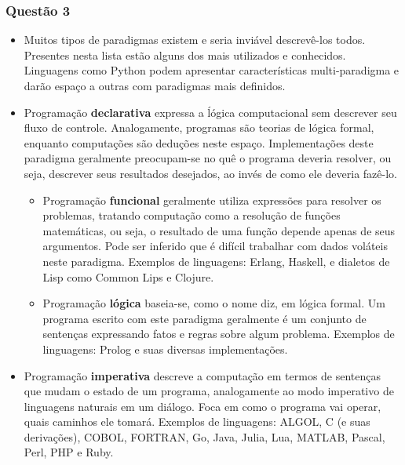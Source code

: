 \documentclass{article}
\begin{document}
\subsubsection*{Questão 3}
\begin{itemize}
    \item Muitos tipos de paradigmas existem e seria inviável descrevê-los
    todos. Presentes nesta lista estão alguns dos mais utilizados e conhecidos.
    Linguagens como Python podem apresentar características multi-paradigma e
    darão espaço a outras com paradigmas mais definidos.

    \item Programação \textbf{declarativa} expressa a ĺógica computacional sem
    descrever seu fluxo de controle. Analogamente, programas são teorias de
    lógica formal, enquanto computações são deduções neste espaço.
    Implementações deste paradigma geralmente preocupam-se no quê o programa
    deveria resolver, ou seja, descrever seus resultados desejados, ao invés de
    como ele deveria fazê-lo.

    \begin{itemize}
        \item Programação \textbf{funcional} geralmente utiliza expressões para
        resolver os problemas, tratando computação como a resolução de funções
        matemáticas, ou seja, o resultado de uma função depende apenas de seus
        argumentos. Pode ser inferido que é difícil trabalhar com dados voláteis
        neste paradigma. Exemplos de linguagens: Erlang, Haskell, e dialetos de
        Lisp como Common Lips e Clojure.

        \item Programação \textbf{lógica} baseia-se, como o nome diz, em lógica
        formal. Um programa escrito com este paradigma geralmente é um conjunto
        de sentenças expressando fatos e regras sobre algum problema. Exemplos
        de linguagens: Prolog e suas diversas implementações.
    \end{itemize}

    \item Programação \textbf{imperativa} descreve a computação em termos de
    sentenças que mudam o estado de um programa, analogamente ao modo imperativo
    de linguagens naturais em um diálogo. Foca em como o programa vai operar,
    quais caminhos ele tomará. Exemplos de linguagens: ALGOL, C (e suas
    derivações), COBOL, FORTRAN, Go, Java, Julia, Lua, MATLAB, Pascal, Perl,
    PHP e Ruby.


\end{itemize}
\end{document}

